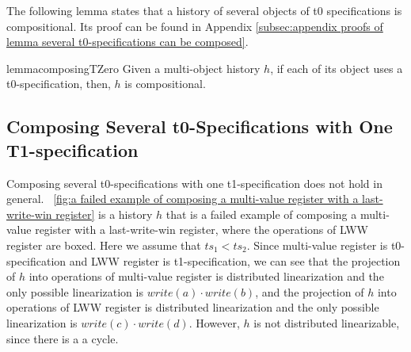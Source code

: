 The following lemma states that a history of several objects of t0 specifications is compositional. Its proof can be found in Appendix \ref{subsec:appendix proofs of lemma several t0-specifications can be composed}.

\begin{restatable}{lemma}{composingTZero}
\label{lemma:several t0-specifications can be composed}
Given a multi-object history $h$, if each of its object uses a t0-specification, then, $h$ is compositional.
\end{restatable}




\subsection{Composing Several t0-Specifications with One T1-specification}
\label{lemma:composing several t0-specification with one t1-specification}

Composing several t0-specifications with one t1-specification does not hold in general. \figurename~\ref{fig:a failed example of composing a multi-value register with a last-write-win register} is a history $h$ that is a failed example of composing a multi-value register with a last-write-win register, where the operations of LWW register are boxed. Here we assume that $\mathit{ts}_1<\mathit{ts}_2$. Since multi-value register is t0-specification and LWW register is t1-specification, we can see that the projection of $h$ into operations of multi-value register is distributed linearization and the only possible linearization is $\mathit{write}(a) \cdot \mathit{write}(b)$, and the projection of $h$ into operations of LWW register is distributed linearization and the only possible linearization is $\mathit{write}(c) \cdot \mathit{write}(d)$. However, $h$ is not distributed linearizable, since there is a a cycle.

